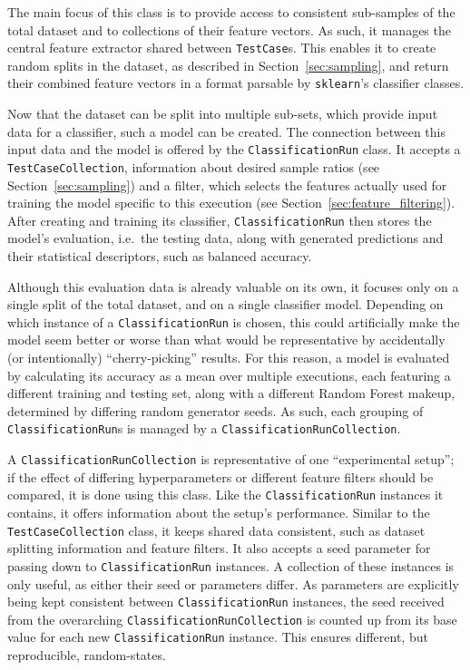 The main focus of this class is to provide access to consistent sub-samples of 
the total dataset and to collections of their feature vectors.  As such, it 
manages the central feature extractor shared between \texttt{TestCase}s. This 
enables it to create random splits in the dataset, as described in 
Section~\ref{sec:sampling}, and return their combined feature vectors in a 
format parsable by \texttt{sklearn}'s classifier classes.

Now that the dataset can be split into multiple sub-sets, which provide input 
data for a classifier, such a model can be created. The connection between this
input data and the model is offered by the \texttt{ClassificationRun} class. 
It accepts a \texttt{TestCaseCollection}, information about desired sample 
ratios (see Section~\ref{sec:sampling}) and a filter, which selects the features
actually used for training the model specific to this execution (see 
Section~\ref{sec:feature_filtering}). After creating and training its 
classifier, \texttt{ClassificationRun} then stores the model's evaluation, 
i.e.~the testing data, along with generated predictions and their statistical 
descriptors, such as balanced accuracy. 

Although this evaluation data is already valuable on its own, it focuses only
on a single split of the total dataset, and on a single classifier model. 
Depending on which instance of a \texttt{ClassificationRun} is chosen, this could
artificially make the model seem better or worse than what would be 
representative by accidentally (or intentionally) \enquote{cherry-picking}
results. For this reason, a model is evaluated by calculating its accuracy as a
mean over multiple executions, each featuring a different training and testing 
set, along with a different Random Forest makeup, determined by differing 
random generator seeds. As such, each grouping of \texttt{ClassificationRun}s
is managed by a \texttt{ClassificationRunCollection}.

A \texttt{ClassificationRunCollection} is representative of one 
\enquote{experimental setup}; if the effect of differing hyperparameters or 
different feature filters should be compared, it is done using this class. 
Like the \texttt{ClassificationRun} instances it contains, it offers information
about the setup's performance. Similar to the \texttt{TestCaseCollection} class,
it keeps shared data consistent, such as dataset splitting information and 
feature filters. It also accepts a seed parameter for passing down to 
\texttt{ClassificationRun} instances. A collection of these instances is only
useful, as either their seed or parameters differ. As parameters are explicitly
being kept consistent between \texttt{ClassificationRun} instances, the seed
received from the overarching \texttt{ClassificationRunCollection} is counted up
from its base value for each new \texttt{ClassificationRun} instance. This 
ensures different, but reproducible, random-states.

